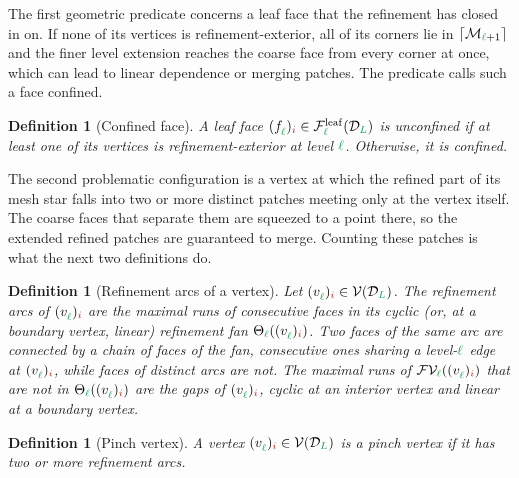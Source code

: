 \documentclass[a4paper, 12pt]{article}
\makeatletter
\newcommand{\robert}[1]{{\color{orange} #1}}
\newcommand{\guidance}[1]{{\color{lime!70!black} #1}}
\newcommand{\green}{\color{ForestGreen}}
\newcommand{\brickred}{\color{BrickRed}}
\newcommand{\V}{\mathcal{V}}
\newcommand{\F}{\mathcal{F}}
\newcommand{\vertex}[2]{\freeQ{v}{}{#1}{#2}}
\newcommand{\face}[2]{\freeQ{f}{}{#1}{#2}}
\newcommand{\FVl}[1]{\F\V_{#1}}
\newcommand{\coarseIdxone}{{\brickred i}}
\renewcommand{\l}{{\green\ell}}
\renewcommand{\L}{{\green L}}
\newcommand{\freeQ}[4]{ ( {#1}^{#2}_{#3} )_{#4}}
\newcommand{\M}{\mathcal{M}}
\newtheorem{definition}[theorem]{Definition}
\theoremstyle{definition}
\theoremstyle{plain}
\numberwithin{equation}{section}
\newcommand{\ancestorPatch}[1]{\lceil #1 \rceil}
\DeclareRobustCommand{\domseq}[1][]{\mathcal{D}\ifx\@empty#1\@empty\else_{#1}\fi}
\newcommand{\refFan}[1]{\Theta_{#1}}                        %
\newcommand{\leafF}[1]{\F^{\mathrm{leaf}}_{#1}}             %
\makeatother
\begin{document}
\smallskip

\guidance{The first geometric predicate concerns a leaf face that the refinement has closed in on. If none of its vertices is refinement-exterior, all of its corners lie in $\ancestorPatch{\M_{\l+1}}$ and the finer level extension reaches the coarse face from every corner at once, which can lead to linear dependence or merging patches. The predicate calls such a face confined.}

\begin{definition}[Confined face]
    \label{def:confined_face}
    \robert{A leaf face $\face{\l}{\coarseIdxone} \in \leafF{\l}(\domseq[\L])$} is \emph{unconfined} if at least one of its vertices is refinement-exterior at level $\l$. Otherwise, it is \emph{confined}.
\end{definition}

The second problematic configuration is a vertex at which the refined part of its mesh star falls into two or more distinct patches meeting only at the vertex itself. The coarse faces that separate them are squeezed to a point there, so the extended refined patches are guaranteed to merge. \guidance{Counting these patches is what the next two definitions do.}

\begin{definition}[Refinement arcs of a vertex]
    \label{def:refinement_arcs}
    Let $\vertex{\l}{\coarseIdxone} \in \V(\domseq[\L])$. The \emph{refinement arcs of $\vertex{\l}{\coarseIdxone}$} are the maximal runs of consecutive faces in its cyclic (or, at a boundary vertex, linear) refinement fan $\refFan{\l}(\vertex{\l}{\coarseIdxone})$. \guidance{Two faces of the same arc are connected by a chain of faces of the fan, consecutive ones sharing a level-$\l$ edge at $\vertex{\l}{\coarseIdxone}$, while faces of distinct arcs are not. The maximal runs of $\FVl{\l}(\vertex{\l}{\coarseIdxone})$ that are \emph{not} in $\refFan{\l}(\vertex{\l}{\coarseIdxone})$ are the \emph{gaps} of $\vertex{\l}{\coarseIdxone}$, cyclic at an interior vertex and linear at a boundary vertex.}
\end{definition}

\begin{definition}[Pinch vertex]
    \label{def:pinch_vertex}
    A vertex $\vertex{\l}{\coarseIdxone} \in \V(\domseq[\L])$ is a \emph{pinch vertex} if it has two or more refinement arcs.
\end{definition}
\end{document}
